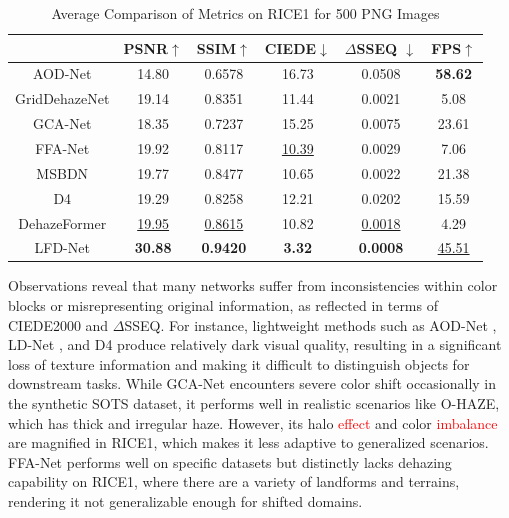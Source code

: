 \documentclass[lettersize,journal]{IEEEtran}
\begin{document}
\begin{table}[H]
    \caption{Average Comparison of Metrics on RICE1 for 500 PNG Images\label{tab:rice}}
    \centering
    \begin{tabular}{cccccc}
    \hline
    &PSNR$\uparrow$ & SSIM$\uparrow$ & CIEDE$\downarrow$ & $\Delta$SSEQ $\downarrow$ & FPS$\uparrow$ \\
    \hline
    AOD-Net       & 14.80 & 0.6578 & 16.73 & 0.0508 & \textbf{58.62} \\
    GridDehazeNet & 19.14 & 0.8351 & 11.44 & 0.0021 & 5.08 \\
    GCA-Net       & 18.35 & 0.7237 & 15.25 & 0.0075 & 23.61 \\    
    FFA-Net       & 19.92 & 0.8117 & \underline{10.39} & 0.0029 & 7.06 \\
    MSBDN         & 19.77 & 0.8477 & 10.65 & 0.0022 & 21.38 \\ %
    D4            & 19.29 & 0.8258 & 12.21 & 0.0202 & 15.59\\
    DehazeFormer  & \underline{19.95} & \underline{0.8615} & 10.82 & \underline{0.0018} & 4.29 \\ %
    LFD-Net       & \textbf{30.88} & \textbf{0.9420} & \textbf{3.32} & \textbf{0.0008} & \underline{45.51} \\
    \hline
    \end{tabular}
\end{table}

Observations reveal that many networks suffer from inconsistencies within color blocks or misrepresenting original information, as reflected in terms of CIEDE2000 and $\Delta$SSEQ. For instance, lightweight methods such as AOD-Net \cite{li2017aod}, LD-Net \cite{ullah2021light}, and D4 \cite{yang2022d4} produce relatively dark visual quality, resulting in a significant loss of texture information and making it difficult to distinguish objects for downstream tasks. While GCA-Net \cite{chen2019gated} encounters severe color shift occasionally in the synthetic SOTS dataset, it performs well in realistic scenarios like O-HAZE, which has thick and irregular haze. However, its halo \textcolor{red}{effect} and color \textcolor{red}{imbalance} are magnified in RICE1, which makes it less adaptive to generalized scenarios. FFA-Net \cite{qin2020ffa} performs well on specific datasets but distinctly lacks dehazing capability on RICE1, where there are a variety of landforms and terrains, rendering it not generalizable enough for shifted domains. 
\end{document}
